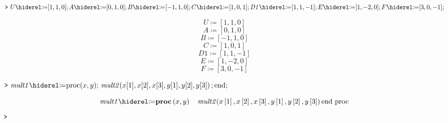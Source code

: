 \documentclass{article}
\begin{document}
\begin{Maple Normal}

\end{Maple Normal}
\mapleinput
{$ \displaystyle \texttt{>\,} \,U \coloneqq [1,1,0];A \coloneqq [0,1,0];B \coloneqq [-1,1,0];C \coloneqq [1,0,1];\mathit{D1} \coloneqq [1,1,-1];E \coloneqq [1,-2,0];F \coloneqq [3,0,-1]; $}

\begin{dmath*}
U \coloneqq \left[1,1,0\right]
\end{dmath*}
\vspace{-\bigskipamount}
\begin{dmath*}
A \coloneqq \left[0,1,0\right]
\end{dmath*}
\vspace{-\bigskipamount}
\begin{dmath*}
B \coloneqq \left[-1,1,0\right]
\end{dmath*}
\vspace{-\bigskipamount}
\begin{dmath*}
C \coloneqq \left[1,0,1\right]
\end{dmath*}
\vspace{-\bigskipamount}
\begin{dmath*}
\mathit{D1} \coloneqq \left[1,1,-1\right]
\end{dmath*}
\vspace{-\bigskipamount}
\begin{dmath*}
E \coloneqq \left[1,-2,0\right]
\end{dmath*}
\vspace{-\bigskipamount}
\begin{dmath}\label{(4)}
F \coloneqq \left[3,0,-1\right]
\end{dmath}
\begin{Maple Normal}

\end{Maple Normal}
\mapleinput
{$ \displaystyle \texttt{>\,} \,\mathit{mult1} \coloneqq \mathrm{proc}(x ,y);\,\mathit{mult2} (x [1],x [2],x [3],y [1],y [2],y [3])\,;\mathrm{end};\, $}

\begin{dmath}\label{(5)}
\mathit{mult1} \coloneqq 
\\
\boldsymbol{\mathrm{proc}}\left(x ,y \right)\quad \mathit{mult2} \! \left(x \left[1\right],x \left[2\right],x \left[3\right],y \left[1\right],y \left[2\right],y \left[3\right]\right)\quad 
\\
\boldsymbol{\textrm{end proc}}
\end{dmath}
\mapleinput
{$ \displaystyle \texttt{>\,}  $}
\end{document}
